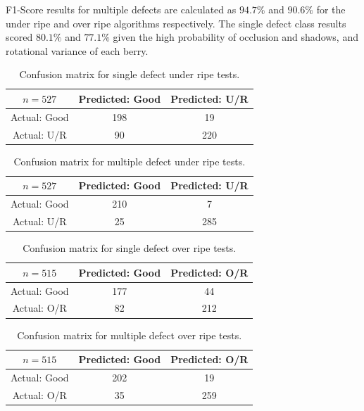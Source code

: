 \documentclass[fleqn,twoside,12pt]{report}
\begin{document}
F1-Score results for multiple defects are calculated as $94.7\%$ and $90.6\%$ for the under ripe and over ripe algorithms respectively. The single defect class results scored $80.1\%$ and $77.1\%$ given the high probability of occlusion and shadows, and rotational variance of each berry.


\begin{table}
	\centering
	\caption{Confusion matrix for single defect under ripe tests.}
	\label{tab:confusion_1}
	\begin{tabular}{ccc}
		\toprule
		$n=527$ & Predicted: Good & Predicted: U/R  \\ 
		\midrule
		Actual: Good   & 198 & 19    \\[6pt] 
		Actual: U/R	   & 90  & 220  \\[6pt] 
		\bottomrule
	\end{tabular}
\end{table}

\begin{table}
	\centering
	\caption{Confusion matrix for multiple defect under ripe tests.}
	\label{tab:confusion_2}
	\begin{tabular}{ccc}
		\toprule
		$n=527$ & Predicted: Good & Predicted: U/R  \\ 
		\midrule
		Actual: Good   & 210 & 7    \\[6pt] 
		Actual: U/R	   & 25  & 285  \\[6pt] 
		\bottomrule
	\end{tabular}
\end{table}

\begin{table}
	\centering
	\caption{Confusion matrix for single defect over ripe tests.}
	\label{tab:confusion_3}
	\begin{tabular}{ccc}
		\toprule
		$n=515$ & Predicted: Good & Predicted: O/R  \\ 
		\midrule
		Actual: Good   & 177 & 44    \\[6pt] 
		Actual: O/R	   & 82  & 212  \\[6pt] 
		\bottomrule
	\end{tabular}
\end{table}

\begin{table}
	\centering
	\caption{Confusion matrix for multiple defect over ripe tests.}
	\label{tab:confusion_4}
	\begin{tabular}{ccc}
		\toprule
		$n=515$ & Predicted: Good & Predicted: O/R  \\ 
		\midrule
		Actual: Good   & 202 & 19    \\[6pt] 
		Actual: O/R	   & 35  & 259  \\[6pt] 
		\bottomrule
	\end{tabular}
\end{table}
\end{document}
